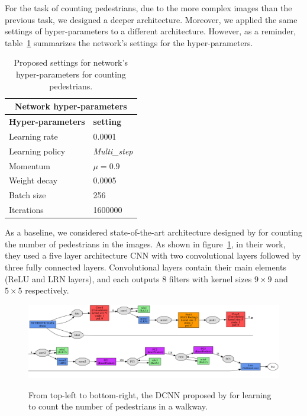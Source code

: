 For the task of counting pedestrians, due to the more complex images than the previous task, we designed a deeper architecture. Moreover, we applied the same settings of hyper-parameters to a different architecture. However, as a reminder, table~\ref{hypar2} summarizes the network's settings for the hyper-parameters.

\begin{table}[H]
	\centering
	\begin{tabular}{ |p{3.8cm}|p{1.7cm}| }
	\hline 
	\multicolumn{2}{|c|}{\textbf{Network hyper-parameters}} \\
	\hline
	\hline
	\textbf{Hyper-parameters} & \textbf{setting }\\
	\hline
	Learning rate & 0.0001\\
	\hline
	Learning policy    & \textit{Multi\_step} \\
	\hline
	Momentum & $\mu = 0.9$\\
	\hline
	Weight decay & 0.0005 \\
	\hline
	Batch size & 256 \\
	\hline
	Iterations & 1600000 \\
	\hline
	\end{tabular}
		\caption{Proposed settings for network's hyper-parameters for counting pedestrians.}
		\label{hypar2}
\end{table} 

As a baseline, we considered state-of-the-art architecture designed by \citet{segui2015learning} for counting the number of pedestrians in the images. As shown in figure~\ref{santiucsdnet}, in their work, they used a five layer architecture CNN with two convolutional layers followed by three fully connected layers. Convolutional layers contain their main elements (ReLU and LRN layers), and each outputs 8 filters with kernel sizes $9\times9$ and $5\times5$ respectively. 

\begin{figure}[H]
  \centering
   {\includegraphics[width=1.00\textwidth]{images/santiucsd}}
	\caption{From top-left to bottom-right, the DCNN proposed by \cite{segui2015learning} for learning to count the number of pedestrians in a walkway.}
	\label{santiucsdnet}
\end{figure}

